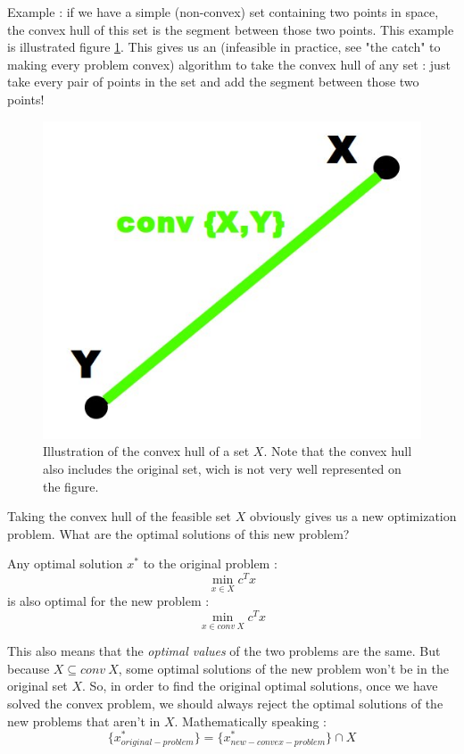 \documentclass[a4paper]{article}
\begin{document}
Example : if we have a simple (non-convex) set containing two points in space, the convex hull of this set is the segment between those two points. This example is illustrated figure \ref{conv}. This gives us an (infeasible in practice, see "the catch" to making every problem convex) algorithm to take the convex hull of any set : just take every pair of points in the set and add the segment between those two points!\\


\begin{figure}[h!]
\centering
\includegraphics[scale=0.2]{conv2}
\caption{Illustration of the convex hull of a set $X$. Note that the convex hull also includes the original set, wich is not very well represented on the figure.}
\label{conv}
\end{figure}

Taking the convex hull of the feasible set $X$ obviously gives us a new optimization problem. What are the optimal solutions of this new problem?

\begin{def2}
Any optimal solution $x^*$ to the original problem :
$$\min_{x \in X} c^T x$$
is also optimal for the new problem :
$$\min_{x \in conv \: X} c^T x$$
\end{def2}

This also means that the \textit{optimal values} of the two problems are the same. But because $X \subseteq conv \: X$, some optimal solutions of the new problem won't be in the original set $X$. So, in order to find the original optimal solutions, once we have solved the convex problem, we should always reject the optimal solutions of the new problems that aren't in $X$. Mathematically speaking : 
$$\{x^*_{original-problem}\} = \{x^*_{new-convex-problem}\} \cap X $$
\end{document}
